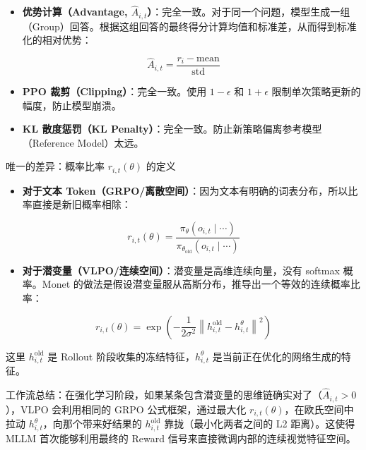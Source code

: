 \begin{itemize}
\tightlist
\item
{}
  \textbf{优势计算（Advantage, \(\hat A_{i,t}\)）}：完全一致。对于同一个问题，模型生成一组（Group）回答。根据这组回答的最终得分计算均值和标准差，从而得到标准化的相对优势：
\end{itemize}

\[
\hat A_{i,t}=\frac{r_i-\mathrm{mean}}{\mathrm{std}}
\]

\begin{itemize}
\tightlist
\item
  \textbf{PPO 裁剪（Clipping）}：完全一致。使用 \(1-\epsilon\) 和 \(1+\epsilon\) 限制单次策略更新的幅度，防止模型崩溃。
\item
  \textbf{KL 散度惩罚（KL Penalty）}：完全一致。防止新策略偏离参考模型（Reference Model）太远。
\end{itemize}

唯一的差异：概率比率 \(r_{i,t}(\theta)\) 的定义

\begin{itemize}
\tightlist
\item
{}
  \textbf{对于文本 Token（GRPO/离散空间）}：因为文本有明确的词表分布，所以比率直接是新旧概率相除：
\end{itemize}

\[
r_{i,t}(\theta)=
\frac{\pi_{\theta}(o_{i,t}\mid\cdots)}
{\pi_{\theta_{\mathrm{old}}}(o_{i,t}\mid\cdots)}
\]

\begin{itemize}
\tightlist
\item
{}
  \textbf{对于潜变量（VLPO/连续空间）}：潜变量是高维连续向量，没有 softmax 概率。Monet 的做法是假设潜变量服从高斯分布，推导出一个等效的连续概率比率：
\end{itemize}

\[
r_{i,t}(\theta)=
\exp\left(
-\frac{1}{2\sigma^2}
\left\lVert h_{i,t}^{\mathrm{old}}-h_{i,t}^{\theta}\right\rVert^2
\right)
\]

这里 \(h_{i,t}^{\mathrm{old}}\) 是 Rollout 阶段收集的冻结特征，\(h_{i,t}^{\theta}\) 是当前正在优化的网络生成的特征。

工作流总结：在强化学习阶段，如果某条包含潜变量的思维链确实对了（\(\hat A_{i,t}>0\)），VLPO 会利用相同的 GRPO 公式框架，通过最大化 \(r_{i,t}(\theta)\)，在欧氏空间中拉动 \(h_{i,t}^{\theta}\)，向那个带来好结果的 \(h_{i,t}^{\mathrm{old}}\) 靠拢（最小化两者之间的 L2 距离）。这使得 MLLM 首次能够利用最终的 Reward 信号来直接微调内部的连续视觉特征空间。


